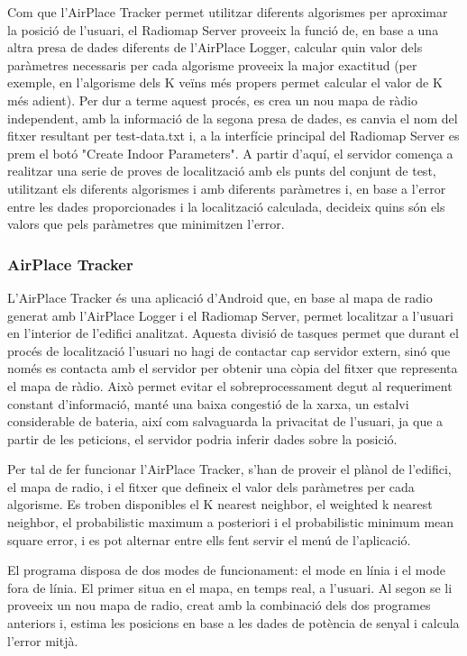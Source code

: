 Com que l'AirPlace Tracker permet utilitzar diferents algorismes per aproximar la posició de l'usuari, el Radiomap Server proveeix la funció de, en base a una altra presa de dades diferents de l'AirPlace Logger, calcular quin valor dels paràmetres necessaris per cada algorisme proveeix la major exactitud (per exemple, en l'algorisme dels K veïns més propers permet calcular el valor de K més adient). Per dur a terme aquest procés, es crea un nou mapa de ràdio independent, amb la informació de la segona presa de dades, es canvia el nom del fitxer resultant per test-data.txt i, a la interfície principal del Radiomap Server es prem el botó "Create Indoor Parameters". A partir d'aquí, el servidor comença a realitzar una serie de proves de localització amb els punts del conjunt de test, utilitzant els diferents algorismes i amb diferents paràmetres i, en base a l'error entre les dades proporcionades i la localització calculada, decideix quins són els valors que pels paràmetres que minimitzen l'error.

\subsubsection{AirPlace Tracker}

L'AirPlace Tracker és una aplicació d'Android que, en base al mapa de radio generat amb l'AirPlace Logger i el Radiomap Server, permet localitzar a l'usuari en l'interior de l'edifici analitzat. Aquesta divisió de tasques permet que durant el procés de localització l'usuari no hagi de contactar cap servidor extern, sinó que només es contacta amb el servidor per obtenir una còpia del fitxer que representa el mapa de ràdio. Això permet evitar el sobreprocessament degut al requeriment constant d'informació, manté una baixa congestió de la xarxa, un estalvi considerable de bateria, així com salvaguarda la privacitat de l'usuari, ja que a partir de les peticions, el servidor podria inferir dades sobre la posició.

Per tal de fer funcionar l'AirPlace Tracker, s'han de proveir el plànol de l'edifici, el mapa de radio, i el fitxer que defineix el valor dels paràmetres per cada algorisme. Es troben disponibles el K nearest neighbor, el weighted k nearest neighbor, el probabilistic maximum a posteriori i el probabilistic minimum mean square error, i es pot alternar entre ells fent servir el menú de l'aplicació.

El programa disposa de dos modes de funcionament: el mode en línia i el mode fora de línia. El primer situa en el mapa, en temps real, a l'usuari. Al segon se li proveeix un nou mapa de radio, creat amb la combinació dels dos programes anteriors i, estima les posicions en base a les dades de potència de senyal i calcula l'error mitjà.

